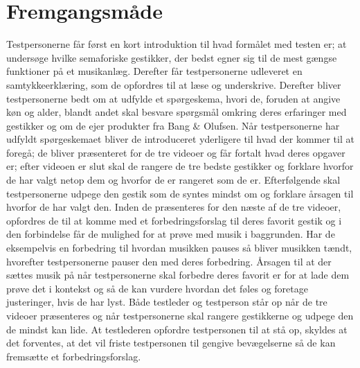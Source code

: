 \section{Fremgangsmåde}
\label{FremgangsmaadeValgAfGestikker}
%
Testpersonerne får først en kort introduktion til hvad formålet med testen er; at undersøge hvilke semaforiske gestikker, der bedst egner sig til de mest gængse funktioner på et musikanlæg. Derefter får testpersonerne udleveret en samtykkeerklæring, som de opfordres til at læse og underskrive. Derefter bliver testpersonerne bedt om at udfylde et spørgeskema, hvori de, foruden at angive køn og alder, blandt andet skal besvare spørgsmål omkring deres erfaringer med gestikker og om de ejer produkter fra Bang $\&$ Olufsen. Når testpersonerne har udfyldt spørgeskemaet bliver de introduceret yderligere til hvad der kommer til at foregå; de bliver præsenteret for de tre videoer og får fortalt hvad deres opgaver er; efter videoen er slut skal de rangere de tre bedste gestikker og forklare hvorfor de har valgt netop dem og hvorfor de er rangeret som de er. Efterfølgende skal testpersonerne udpege den gestik som de syntes mindst om og forklare årsagen til hvorfor de har valgt den. Inden de præsenteres for den næste af de tre videoer, opfordres de til at komme med et forbedringsforslag til deres favorit gestik og i den forbindelse får de mulighed for at prøve med musik i baggrunden. Har de eksempelvis en forbedring til hvordan musikken pauses så bliver musikken tændt, hvorefter testpersonerne pauser den med deres forbedring. Årsagen til at der sættes musik på når testpersonerne skal forbedre deres favorit er for at lade dem prøve det i kontekst og så de kan vurdere hvordan det føles og foretage justeringer, hvis de har lyst. Både testleder og testperson står op når de tre videoer præsenteres og når testpersonerne skal rangere gestikkerne og udpege den de mindst kan lide. At testlederen opfordre testpersonen til at stå op, skyldes at det forventes, at det vil friste testpersonen til gengive bevægelserne så de kan fremsætte et forbedringsforslag. 


